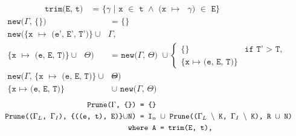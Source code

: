 \begin{figure}
	\begin{mdframed}[style=bigbox]
		\begin{align}
			\texttt{trim(E, t) } & \texttt{= \{$\gamma$ | x $\in$ t $\land$ (x $\mapsto$ $\gamma$) $\in$ E\}} \tag*{}
		\end{align}
		\begin{align}
			\texttt{new($\Gamma$, \{\}) }                                      & \texttt{= \{\} }\tag*{}                        \\
			\texttt{new(\{x $\mapsto$ (e', E', T')\} $\cup$ $\Gamma$,}\tag*{}                                                   \\
			\texttt{\{x $\mapsto$ (e, E, T)\} $\cup$ $\Theta$) }               & \texttt{= new($\Gamma$, $\Theta$) $\cup$}
			\begin{cases}
				\texttt{\{\}}                      & \texttt{if T' $>$ T,} \\
				\texttt{\{x $\mapsto$ (e, E, T)\}} &
			\end{cases}
			\tag*{}                                                                                                             \\
			\texttt{new($\Gamma$, \{x $\mapsto$ (e, E, T)\} $\cup$ $\Theta$) } & \texttt{=}\tag*{}                              \\
			\texttt{\{x $\mapsto$ (e, E, T)\} }                                & \texttt{$\cup$ new($\Gamma$, $\Theta$)}\tag*{}
		\end{align}
		\begin{align}
			\texttt{Prune($\Gamma$, \{\}) }                                   & \texttt{= \{\}} \tag*{}                                                                                    \\
			\texttt{Prune(($\Gamma_L$, $\Gamma_I$), \{((e, t), E)\}$\cup$N) } & \texttt{=  I$_n$ $\cup$ Prune(($\Gamma_L$ $\backslash$ K, $\Gamma_I$ $\backslash$ K), R $\cup$ N)} \tag*{} \\
			\wherecase{A = trim(E, t),} \tag*{}                                                                                                                                            \\

\end{align}
\end{mdframed}
\end{figure}
